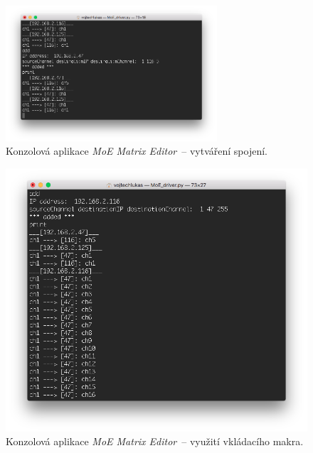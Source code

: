 \begin{figure}[p]
    \centering
    \includegraphics[width=0.7\textwidth]{obrazky/MoE_Editor_2.png}
    \caption{Konzolová aplikace \emph{MoE Matrix Editor}~-- vytváření spojení.}
\end{figure}

\begin{figure}[p]
    \centering
    \includegraphics[width=.7\textwidth]{obrazky/MoE_editor_3.png}
    \caption{Konzolová aplikace \emph{MoE Matrix Editor}~-- využití vkládacího makra.}
\end{figure}
